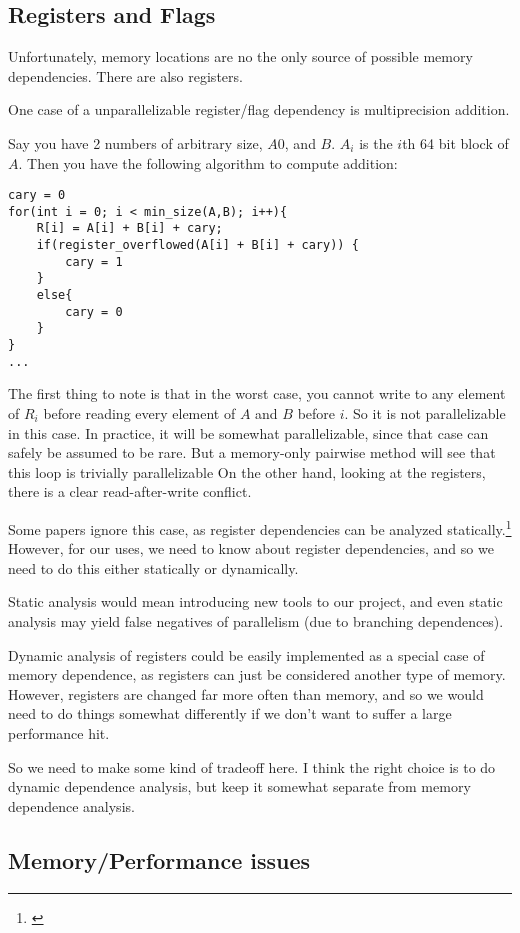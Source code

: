 \documentclass[12pt,twoside]{reedthesis}
\begin{document}
		\subsection{Registers and Flags}
		Unfortunately, memory locations are no the only source of possible memory dependencies. There are also registers.


		One case of a unparallelizable register/flag dependency is multiprecision addition.

		Say you have 2 numbers of arbitrary size, $A0$, and $B$. $A_i$ is the $i$th 64 bit block of $A$. Then you have the following algorithm to compute addition:

		\begin{lstlisting}
cary = 0
for(int i = 0; i < min_size(A,B); i++){
	R[i] = A[i] + B[i] + cary;
	if(register_overflowed(A[i] + B[i] + cary)) {
		cary = 1
	}
	else{
		cary = 0
	}
}
...
		\end{lstlisting}

		The first thing to note is that in the worst case, you cannot write to any element of $R_i$ before reading every element of $A$ and $B$ before $i$. So it is not parallelizable in this case. In practice, it will be somewhat parallelizable, since that case can safely be assumed to be rare. But a memory-only pairwise method will see that this loop is trivially parallelizable On the other hand, looking at the registers, there is a clear read-after-write conflict.

		Some papers ignore this case, as register dependencies can be analyzed statically.\footnote{\cite{Chen:2004}} However, for our uses, we need to know about register dependencies, and so we need to do this either statically or dynamically.

		Static analysis would mean introducing new tools to our project, and even static analysis may yield false negatives of parallelism (due to branching dependences).

		Dynamic analysis of registers could be easily implemented as a special case of memory dependence, as registers can just be considered another type of memory. However, registers are changed far more often than memory, and so we would need to do things somewhat differently if we don't want to suffer a large performance hit.

		So we need to make some kind of tradeoff here. I think the right choice is to do dynamic dependence analysis, but keep it somewhat separate from memory dependence analysis.


		\subsection{Memory/Performance issues}
\end{document}
